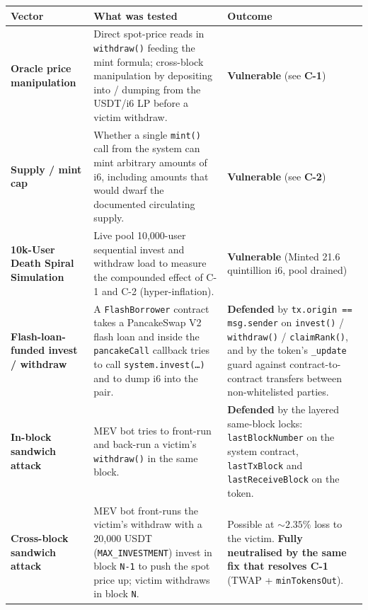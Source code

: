 \documentclass[11pt,a4paper]{article}
\begin{document}
\begin{center}
\renewcommand{\arraystretch}{1.35}
\begin{longtable}{>{\bfseries}p{4.8cm} p{6.1cm} p{3.5cm}}
\toprule
\textbf{Vector} & \textbf{What was tested} & \textbf{Outcome} \\
\midrule
\endhead

Oracle price manipulation
  & Direct spot-price reads in \texttt{withdraw()} feeding the mint
    formula; cross-block manipulation by depositing into / dumping from
    the USDT/i6 LP before a victim withdraw.
  & \textcolor{critred}{\textbf{Vulnerable}} (see \textbf{C-1}) \\

Supply / mint cap
  & Whether a single \texttt{mint()} call from the system can mint
    arbitrary amounts of i6, including amounts that would dwarf the
    documented circulating supply.
  & \textcolor{critred}{\textbf{Vulnerable}} (see \textbf{C-2}) \\

10k-User Death Spiral Simulation
  & Live pool 10,000-user sequential invest and withdraw load to measure
    the compounded effect of C-1 and C-2 (hyper-inflation).
  & \textcolor{critred}{\textbf{Vulnerable}} (Minted 21.6 quintillion i6, pool drained) \\

Flash-loan-funded invest / withdraw
  & A \texttt{FlashBorrower} contract takes a PancakeSwap V2 flash loan
    and inside the \texttt{pancakeCall} callback tries to call
    \texttt{system.invest(\dots)} and to dump i6 into the pair.
  & \textcolor{passgreen}{\textbf{Defended}} by
    \texttt{tx.origin == msg.sender} on
    \texttt{invest()} / \texttt{withdraw()} / \texttt{claimRank()},
    and by the token's \texttt{\_update} guard against contract-to-contract
    transfers between non-whitelisted parties. \\

In-block sandwich attack
  & MEV bot tries to front-run and back-run a victim's \texttt{withdraw()}
    in the same block.
  & \textcolor{passgreen}{\textbf{Defended}} by the layered same-block
    locks: \texttt{lastBlockNumber} on the system contract,
    \texttt{lastTxBlock} and \texttt{lastReceiveBlock} on the token. \\

Cross-block sandwich attack
  & MEV bot front-runs the victim's withdraw with a 20{,}000 USDT
    (\texttt{MAX\_INVESTMENT}) invest in block \texttt{N-1} to push the
    spot price up; victim withdraws in block \texttt{N}.
  & Possible at ${\sim}2.35\%$ loss to the victim. \textbf{Fully neutralised
    by the same fix that resolves C-1} (TWAP + \texttt{minTokensOut}). \\


\end{longtable}
\end{center}
\end{document}
